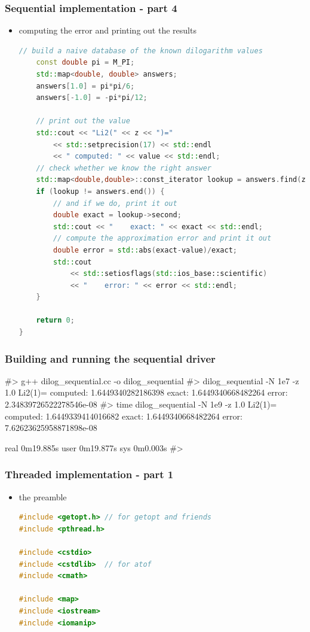\begin{frame}[fragile]
%
  \frametitle{Sequential implementation - part 4}
%
  \begin{itemize}
  \item computing the error and printing out the results
  \begin{lstlisting}[language=c++,name=sequential]
    // build a naive database of the known dilogarithm values
    const double pi = M_PI;
    std::map<double, double> answers;
    answers[1.0] = pi*pi/6;
    answers[-1.0] = -pi*pi/12;

    // print out the value
    std::cout << "Li2(" << z << ")="
        << std::setprecision(17) << std::endl
        << " computed: " << value << std::endl;
    // check whether we know the right answer
    std::map<double,double>::const_iterator lookup = answers.find(z);
    if (lookup != answers.end()) {
        // and if we do, print it out
        double exact = lookup->second;
        std::cout << "    exact: " << exact << std::endl;
        // compute the approximation error and print it out
        double error = std::abs(exact-value)/exact;
        std::cout 
            << std::setiosflags(std::ios_base::scientific) 
            << "    error: " << error << std::endl;
    }

    return 0;
}
  \end{lstlisting}
%
  \end{itemize}
%
\end{frame}

\begin{frame}[fragile]
%
  \frametitle{Building and running the sequential driver}
%
  \begin{shell}{}
#> g++ dilog_sequential.cc -o dilog_sequential
#> dilog_sequential -N 1e7 -z 1.0
Li2(1)=
 computed: 1.6449340282186398
    exact: 1.6449340668482264
    error: 2.34839726522278546e-08
#> time dilog_sequential -N 1e9 -z 1.0
Li2(1)=
 computed: 1.6449339414016682
    exact: 1.6449340668482264
    error: 7.62623625958871898e-08

real    0m19.885s
user    0m19.877s
sys     0m0.003s
#>
  \end{shell}
%
\end{frame}

\begin{frame}[fragile]
%
  \frametitle{Threaded implementation - part 1}
%
  \begin{itemize}
  \item the preamble
  \begin{lstlisting}[language=c++,name=threaded]
#include <getopt.h> // for getopt and friends
#include <pthread.h>

#include <cstdio>
#include <cstdlib>  // for atof
#include <cmath>

#include <map>
#include <iostream>
#include <iomanip>

  \end{lstlisting}
%
  \end{itemize}
%
\end{frame}

